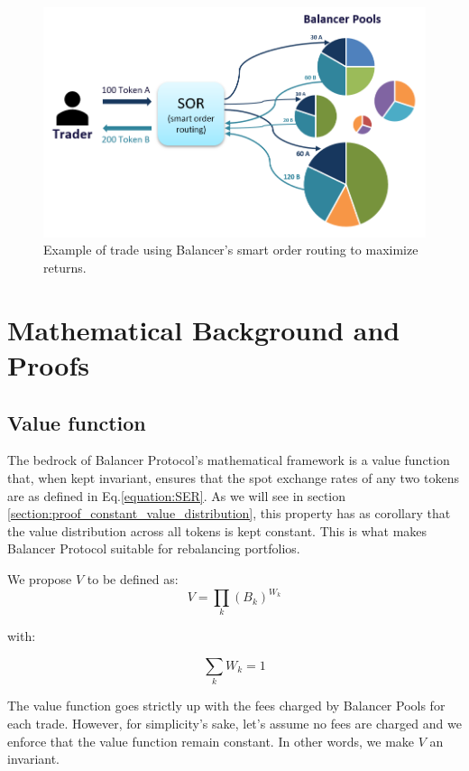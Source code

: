 \documentclass[11pt]{amsart}
\begin{document}
\begin{figure}
  \includegraphics[]{smart_order_routing}
  \caption{Example of trade using Balancer's smart order routing to maximize returns.}
  \label{fig:smart_order_routing}
\end{figure}

\section{Mathematical Background and Proofs}
\label{section:maths}

\subsection{Value function}
The bedrock of Balancer Protocol's mathematical framework is a value function that, when kept invariant, ensures that the spot exchange rates of any two tokens are as defined in Eq.\ref{equation:SER}. As we will see in section \ref{section:proof_constant_value_distribution}, this property has as corollary that the value distribution across all tokens is kept constant. This is what makes Balancer Protocol suitable for rebalancing portfolios.

We propose $V$ to be defined as:
\begin{equation}
\label{equation:value_function}
V = \prod_{k}(B_k)^{W_k}
\end{equation}

with:

\begin{equation}
\label{equation:sum_weights}
\sum_{k} W_k = 1
\end{equation}

The value function goes strictly up with the fees charged by Balancer Pools for each trade. However, for simplicity's sake, let's assume no fees are charged and we enforce that the value function remain constant. In other words, we make $V$ an invariant.
\end{document}
